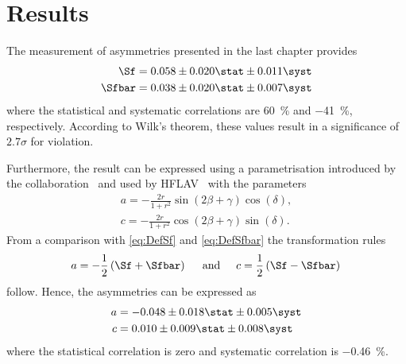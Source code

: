 \chapter{Results}

The measurement of \CP asymmetries presented in the last chapter provides
\begin{equation}
\begin{aligned}
\Sf&=0.058\pm0.020\stat\pm0.011\syst\\
\Sfbar&=0.038\pm0.020\stat\pm0.007\syst
\end{aligned}
\end{equation}
where the statistical and systematic correlations are \SI{60}{\percent} and \SI{-41}{\percent}, respectively.
According to Wilk's theorem, these values result in a significance of $2.7\sigma$ for \mbox{\CP violation}.

Furthermore, the result can be expressed using a parametrisation introduced by the \babar collaboration~\cite{Aubert:2006tw} and used by HFLAV~\cite{HFLAV2016} with the parameters
\begin{equation}
\begin{aligned}
a=-\frac{2r}{1+r^2}\sin\!\left(2\beta+\gamma\right)\cos\!\left(\delta\right),\\
c=-\frac{2r}{1+r^2}\cos\!\left(2\beta+\gamma\right)\sin\!\left(\delta\right).
\end{aligned}
\end{equation}
From a comparison with \cref{eq:DefSf} and \eqref{eq:DefSfbar} the transformation rules
\begin{equation}
a=-\frac{1}{2}\left(\Sf+\Sfbar\right)\hspace{0.5cm}\text{and}\hspace{0.5cm}c=\frac{1}{2}\left(\Sf-\Sfbar\right)\\
\end{equation}
follow.
Hence, the \CP asymmetries can be expressed as
\begin{equation}
\begin{aligned}
a&=-0.048\pm0.018\stat\pm0.005\syst\\
c&=0.010\pm0.009\stat\pm0.008\syst\\
\end{aligned}
\end{equation}
where the statistical correlation is zero and systematic correlation is \SI{-0.46}{\percent}.

